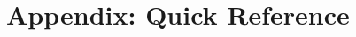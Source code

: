 \documentclass[../notes.tex]{subfiles}
\begin{document}
\section{Appendix: Quick Reference}
\end{document}
